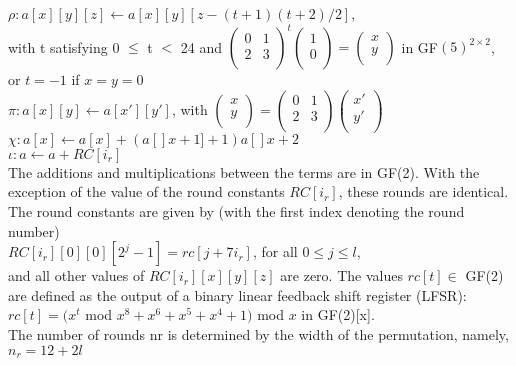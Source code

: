 $\rho : a[x][y][z] \leftarrow a[x][y][z − (t + 1)(t + 2)/2]$,\\
with t satisfying 0 $\leq$ t $<$ 24 and
$ \left( \begin{array}{cc}
0 & 1 \\
2 & 3 \\
\end{array}
\right)^{t}
\left(
\begin{array}{c}
1 \\
0 \\
\end{array}
\right) =
\left(
\begin{array}{c}
x\\
y\\
\end{array}
\right)
$ in GF$(5)^{2 \times 2}$,\\
or $t = -1$ if $x = y = 0$ \\

$ \pi: a[x][y] \leftarrow a[x'][y'] $, with
$\left( \begin{array}{c}
x \\
y \\
\end{array}
\right) = \left( \begin{array}{cc}
0 & 1 \\
2 & 3 \\
\end{array}
\right)
\left( \begin{array}{c}
x' \\
y' \\
\end{array}
\right)$\\

$\chi: a[x] \leftarrow a[x] + (a[]x+1]+1)a[]x+2$\\

$\iota: a \leftarrow a + RC[i_r]$ \\


The additions and multiplications between the terms are in GF(2). With the exception of
the value of the round constants $RC[i_r]$, these rounds are identical. The round constants are
given by (with the first index denoting the round number)\\

$RC[i_r][0][0][2^j − 1] = rc[j + 7i_r ]$, for all $0 \leq j \leq l$,\\

and all other values of $RC[i_r][x][y][z]$ are zero. The values $rc[t] \in $ GF(2) are defined as the
output of a binary linear feedback shift register (LFSR):\\

$rc[t] = (x^t$ mod $x^8 + x^6 + x^5 + x^4 + 1)$ mod $x$ in GF(2)[x].\\

The number of rounds nr is determined by the width of the permutation, namely,\\

$n_r = 12 + 2l$


